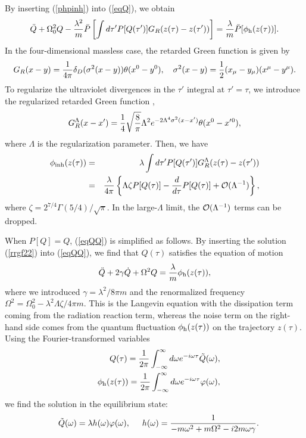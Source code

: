\documentclass[aps,prd,preprintnumbers,nofootinbib,showpacs,11pt]{revtex4}%
\begin{document}
\begin{widetext}
By inserting (\ref{phpinh}) into (\ref{eqQ}), we obtain
\begin{eqnarray}
\ddot Q+\Omega^2_0 Q-{\lambda^2\over m}\bar P\left[
\int d\tau' P[Q(\tau')]G_R(z(\tau)-z(\tau'))\right]
={\lambda\over m}\bar P[\phi_{\rm h}(z(\tau))]. 
\label{eqQQ}
\end{eqnarray}
%
In the four-dimensional massless case, the retarded Green function is given by
\begin{eqnarray}
G_R(x-y)={1\over 4\pi}\delta_D(\sigma^2(x-y))\theta(x^0-y^0)
, ~~~\sigma^2(x-y)={1\over 2}(x_\mu-y_\mu)(x^\mu-y{}^\mu).
\end{eqnarray}
To regularize the ultraviolet divergences in the $\tau'$ integral at $\tau'=\tau$,
we introduce the regularized retarded Green function \cite{LH},
\begin{eqnarray}
G_R^\Lambda(x-x')={1\over 4}\sqrt{8\over\pi}\Lambda^2 e^{-2\Lambda^4\sigma^2(x-x')}\theta(x^0-x'{}^0),
\label{rrgf}
\end{eqnarray}
where $\Lambda$ is the regularization parameter. 
Then, we have
\begin{eqnarray}
\phi_{\rm inh}(z(\tau))&=&\lambda \int d\tau' P[Q(\tau')] G_R^\Lambda(z(\tau)-z(\tau'))
\nonumber\\
&=&{\lambda\over 4\pi}\left\{\Lambda\zeta P[Q(\tau)]-{d\over d\tau}P[Q(\tau)]+{\cal O}(\Lambda^{-1})\right\},
\label{rrgf22}
\end{eqnarray}
where $\zeta=2^{7/4}\Gamma(5/4)/\sqrt{\pi}$. In the large-$\Lambda$ limit, the ${\cal O}(\Lambda^{-1})$ terms
can be dropped.


When $P[Q]=Q$, (\ref{eqQQ}) is simplified as follows. 
By inserting the solution (\ref{rrgf22}) into (\ref{eqQQ}),
we find that $Q(\tau)$ satisfies the equation of motion
\begin{eqnarray}
\ddot Q+2\gamma \dot Q +\Omega^2 Q={\lambda\over m}\phi_{\rm h}(z(\tau)),
\end{eqnarray}
where we introduced $\gamma=\lambda^2/8\pi m$ and the renormalized frequency $\Omega^2
=\Omega_0^2-\lambda^2\Lambda\zeta/4\pi m$.
This is the Langevin equation with the dissipation term coming from the radiation reaction term,
whereas the noise term on the right-hand side comes from the quantum fluctuation $\phi_{\rm h}(z(\tau))$
on the trajectory $z(\tau)$. 
Using the Fourier-transformed variables 
\begin{eqnarray}
&&Q(\tau)={1\over2\pi}\int_{-\infty}^{\infty} d\omega e^{-i\omega\tau}\tilde Q(\omega),
\label{solQtau}
\\
&&\phi_{\rm h}(z(\tau))={1\over2\pi}\int_{-\infty}^{\infty} d\omega e^{-i\omega\tau}\varphi(\omega),
\label{solphih}
\end{eqnarray}
we find the solution in the equilibrium state:
\begin{eqnarray}
&&\tilde Q(\omega)=\lambda h(\omega) \varphi(\omega) , \hspace{5mm}
h(\omega)={1\over -m\omega^2+m\Omega^2-i2m{\omega\gamma}}. 
\label{solQ}
\end{eqnarray}


\end{widetext}
\end{document}
